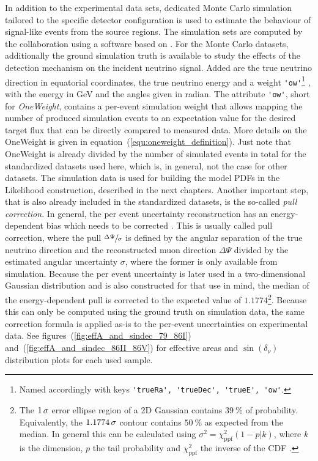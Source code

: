 In addition to the experimental data sets, dedicated Monte Carlo simulation tailored to the specific detector configuration is used to estimate the behaviour of signal-like events from the source regions.
The simulation sets are computed by the collaboration using a software based on \cite{Gazizov:2004va}.
For the Monte Carlo datasets, additionally the ground simulation truth is available to study the effects of the detection mechanism on the incident neutrino signal.
Added are the true neutrino direction in equatorial coordinates, the true neutrino energy and a weight \lstinline!'ow'!\footnote{Named accordingly with keys \lstinline!'trueRa', 'trueDec', 'trueE', 'ow'!.} , with the energy in GeV and the angles given in radian.
The attribute \lstinline!'ow'!, short for \emph{OneWeight}, contains a per-event simulation weight that allows mapping the number of produced simulation events to an expectation value for the desired target flux that can be directly compared to measured data.
More details on the OneWeight is given in equation~(\ref{equ:oneweight_definition}).
Just note that OneWeight is already divided by the number of simulated events in total for the standardized datasets used here, which is, in general, not the case for other datasets.
The simulation data is used for building the model PDFs in the Likelihood construction, described in the next chapters.
Another important step, that is also already included in the standardized datasets, is the so-called \emph{pull correction}.
In general, the per event uncertainty reconstruction has an energy-dependent bias which needs to be corrected \cite{Neunhoffer:2004ha}.
This is usually called pull correction, where the pull $\sfrac{\Delta\Psi}{\sigma}$ is defined by the angular separation of the true neutrino direction and the reconstructed muon direction $\Delta\Psi$ divided by the estimated angular uncertainty $\sigma$, where the former is only available from simulation.
Because the per event uncertainty is later used in a two-dimensional Gaussian distribution and is also constructed for that use in mind, the median of the energy-dependent pull is corrected to the expected value of $\num{1.1774}$\footnote{The $\num{1}\,\sigma$ error ellipse region of a 2D Gaussian contains $\SI{39}{\percent}$ of probability. Equivalently, the $\num{1.1774}\,\sigma$ contour contains $\SI{50}{\percent}$ as expected from the median. In general this can be calculated using $\sigma^2 = \chi^2_\text{ppf}(1-p|k)$, where $k$ is the dimension, $p$ the tail probability and $\chi^2_\text{ppf}$ the inverse of the CDF \cite{Siotani:1963Gaus}.}.
Because this can only be computed using the ground truth on simulation data, the same correction formula is applied as-is to the per-event uncertainties on experimental data.
See figures~(\ref{fig:effA_and_sindec_79_86I}) and~(\ref{fig:effA_and_sindec_86II_86V}) for effective areas and $\sin(\delta_\nu)$ distribution plots for each used sample.

